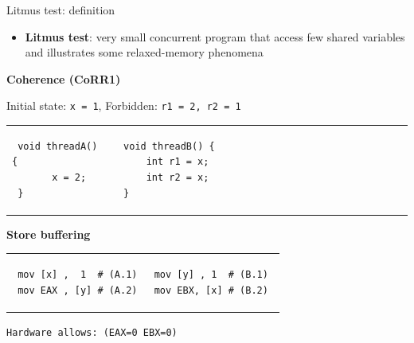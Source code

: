 \begin{frame}[fragile]{Litmus test: definition}

\begin{itemize}
    \item \textbf{Litmus test}: very small concurrent program that access few shared variables and illustrates some relaxed-memory phenomena
\end{itemize}

\pause

\textbf{Coherence (CoRR1)}

Initial state: \texttt{x = 1}, Forbidden: \texttt{r1 = 2, r2 = 1}
\begin{tabular}{p{} p{}} 
 \begin{verbatim}
 void threadA() {
       x = 2;   
 }
 \end{verbatim}
 &  
 \begin{verbatim}
 void threadB() {                                   
     int r1 = x;                           
     int r2 = x;                           
 }                    
 \end{verbatim}
\end{tabular}

\pause

\textbf{Store buffering}

 \begin{tabular}{p{} p{}}
 \begin{verbatim}
 mov [x] ,  1  # (A.1)
 mov EAX , [y] # (A.2)
 \end{verbatim}
 
 & 
 
 \begin{verbatim}
 mov [y] , 1  # (B.1) 
 mov EBX, [x] # (B.2) 
 \end{verbatim}
 \end{tabular}

 \texttt{Hardware allows: (EAX=0 EBX=0)}

\end{frame}

